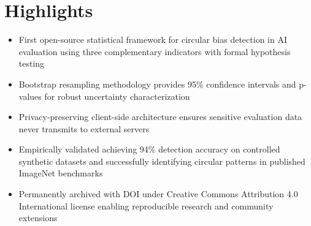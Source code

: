 \documentclass[10pt]{article}
\begin{document}
\section*{Highlights}

\begin{itemize}
    \item First open-source statistical framework for circular bias detection in AI evaluation using three complementary indicators with formal hypothesis testing
    \item Bootstrap resampling methodology provides 95\% confidence intervals and p-values for robust uncertainty characterization
    \item Privacy-preserving client-side architecture ensures sensitive evaluation data never transmits to external servers
    \item Empirically validated achieving 94\% detection accuracy on controlled synthetic datasets and successfully identifying circular patterns in published ImageNet benchmarks
    \item Permanently archived with DOI under Creative Commons Attribution 4.0 International license enabling reproducible research and community extensions
\end{itemize}
\end{document}
